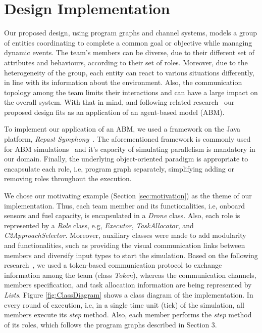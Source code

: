 \newpage
\section{Design Implementation}
\label{sec:design}

Our proposed design, using program graphs and channel systems, models a group of entities coordinating to complete a common goal or objective while managing dynamic events. The team's members can be diverse, due to their different set of attributes and behaviours, according to their set of roles. Moreover, due to the heterogeneity of the group, each entity can react to various situations differently, in line with its information about the environment. Also, the communication topology among the team limits their interactions and can have a large impact on the overall system. With that in mind, and following related research~\cite{evaluating} our proposed design fits as an application of an agent-based model (ABM). 

To implement our application of an ABM, we used a framework on the Java platform, \textit{Repast Symphony}~\cite{repastDoc}. The aforementioned framework is commonly used for ABM simulations~\cite{repast} and it's capacity of simulating parallelism is mandatory in our domain. Finally, the underlying object-oriented paradigm is appropriate to encapsulate each role, i.e, program graph separately, simplifying adding or removing roles throughout the execution.

We chose our motivating example (Section \ref{sec:motivation}) as the theme of our implementation. Thus, each team member and its functionalities, i.e, onboard sensors and fuel capacity, is encapsulated in a \textit{Drone} class. Also, each role is represented by a \textit{Role} class, e.g, \textit{Executor}, \textit{TaskAllocator}, and \textit{C2ApproachSelector}. Moreover, auxiliary classes were made to add modularity and functionalities, such as providing the visual communication links between members and diversify input types to start the simulation. Based on the following research~\cite{swarmGap}, we used a token-based communication protocol to exchange information among the team (class \textit{Token}), whereas the communication channels, members specification, and task allocation information are being represented by \textit{Lists}. Figure \ref{fig:ClassDiagram} shows a class diagram of the implementation. In every round of execution, i.e, in a single time unit (tick) of the simulation, all members execute its \textit{step} method. Also, each member performs the \textit{step} method of its roles, which follows the program graphs described in Section 3.

